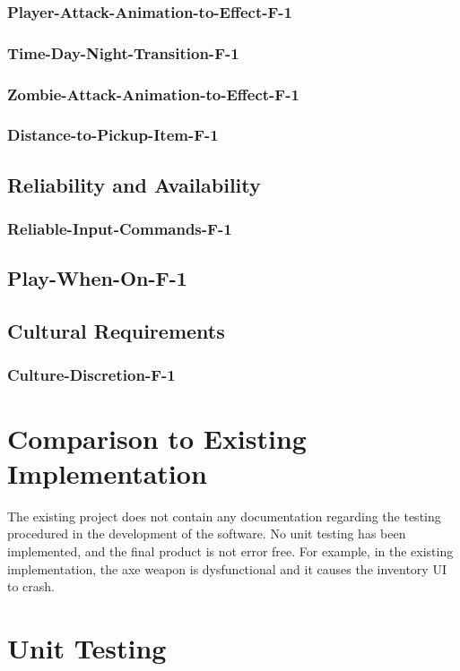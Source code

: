 \documentclass[12pt, titlepage]{article}
\begin{document}
	\subsubsection{Player-Attack-Animation-to-Effect-F-1}
	\subsubsection{Time-Day-Night-Transition-F-1}
	\subsubsection{Zombie-Attack-Animation-to-Effect-F-1}
	\subsubsection{Distance-to-Pickup-Item-F-1}
\subsection{Reliability and Availability}
	\subsubsection{Reliable-Input-Commands-F-1}
	\subsection{Play-When-On-F-1}
\subsection{Cultural Requirements}
	\subsubsection{Culture-Discretion-F-1}
	
\section{Comparison to Existing Implementation}	

The existing project does not contain any documentation regarding the testing procedured in the development of the software. No unit testing has been implemented, and the final product is not error free. For example, in the existing implementation, the axe weapon is dysfunctional and it causes the inventory UI to crash.

\section{Unit Testing}
\end{document}
